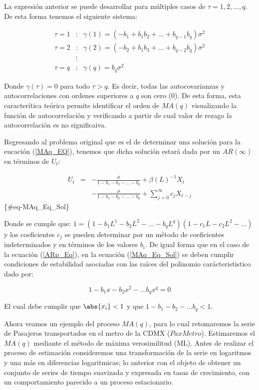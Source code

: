 \documentclass[
  a4paper,
]{article}
\begin{document}
La expresión anterior se puede desarrollar para múltiples casos de
\(\tau = 1, 2, \ldots, q\). De esta forma tenemos el siguiente sistema:

\begin{eqnarray}
    \tau = 1 & : & \gamma(1) = (- b_1 + b_1 b_2 + \ldots + b_{q-1} b_q) \sigma^2 \nonumber \\
    \tau = 2 & : & \gamma(2) = (- b_2 + b_1 b_3 + \ldots + b_{q-2} b_q) \sigma^2 \nonumber \\
    & \vdots & \nonumber \\
    \tau = q & : & \gamma(q) = b_q \sigma^2 \nonumber
\end{eqnarray}

Donde \(\gamma(\tau) = 0\) para todo \(\tau > q\). Es decir, todas las
autocovarianzas y autocorrelaciones con ordenes superiores a \(q\) son
cero (0). De esta forma, esta caracterítica teórica permite identificar
el orden de \(MA(q)\) visualizando la función de autocorrelación y
verificando a partir de cual valor de rezago la autocorrelación es no
significaiva.

Regresando al problema original que es el de determinar una solución
para la eucación (\ref{MAq_EQ}), tenemos que dicha solución estará dada
por un \(AR(\infty)\) en términos de \(U_t\):

\begin{eqnarray}
    U_t & = & - \frac{\mu}{1 - b_1 - b_2 - \ldots - b_q} + \beta(L)^{-1} X_t \nonumber \\
    &   & - \frac{\mu}{1 - b_1 - b_2 - \ldots - b_q} + \sum_{j = 0}^{\infty} c_j X_{t-j} 
\end{eqnarray} \{\#eq-MAq\_Eq\_Sol\}

Donde se cumple que:
\(1 = (1 - b_1 L^1 - b_2 L^2 - \ldots - b_q L^q)(1 - c_1 L - c_2 L^2 - \ldots)\)
y los coeficientes \(c_j\) se pueden determinar por un método de
coeficientes indeterminados y en términos de los valores \(b_i\). De
igual forma que en el caso de la ecuación (\ref{ARp_Eq}), en la ecuación
(\ref{MAq_Eq_Sol}) se deben cumplir condiciones de estabilidad asociadas
con las raíces del polinomio carácterististico dado por:

\[
1 - b_1 x - b_2 x^2 - \ldots b_q x^q = 0
\]

El cual debe cumplir que \(\abs{x_i} < 1\) y que
\(1 - b_1 - b_2 - \ldots b_q < 1\).

Ahora veamos un ejemplo del proceso \(MA(q)\), para lo cual retomaremos
la serie de Pasajeros transportados en el metro de la CDMX
(\(PaxMetro\)). Estimaremos el \(MA(q)\) mediante el método de máxima
verosimilitud (ML). Antes de realizar el proceso de estimación
consideremos una transformación de la serie en logaritmos y una más en
diferencias logaritmicas; lo anterior con el objeto de obtener un
conjunto de series de tiempo suavizada y expresada en tasas de
crecimiento, con un comportamiento parecido a un proceso estacionario.
\end{document}

